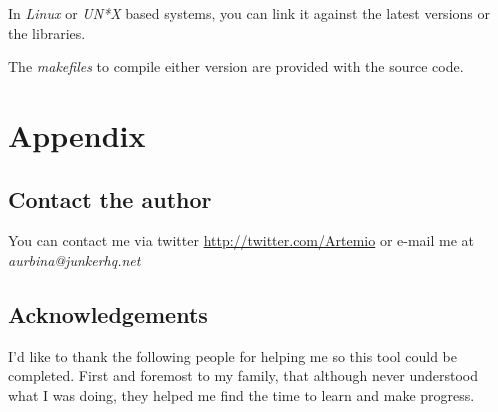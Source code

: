 \documentclass[10pt,a4paper]{report}
\begin{document}
In \textit{Linux} or \textit{UN*X} based systems, you can link it against the latest versions or the libraries.

The \textit{makefiles} to compile either version are provided with the source code\cite{sourcecode}.

\chapter{Appendix}

\section{Contact the author}
\label{contact}

You can contact me via twitter \url{http://twitter.com/Artemio} or e-mail me at \textit{aurbina@junkerhq.net}

\section{Acknowledgements}

I'd like to thank the following people for helping me so this tool could be completed. First and foremost to my family, that although never understood what I was doing, they helped me find the time to learn and make progress.
\end{document}
